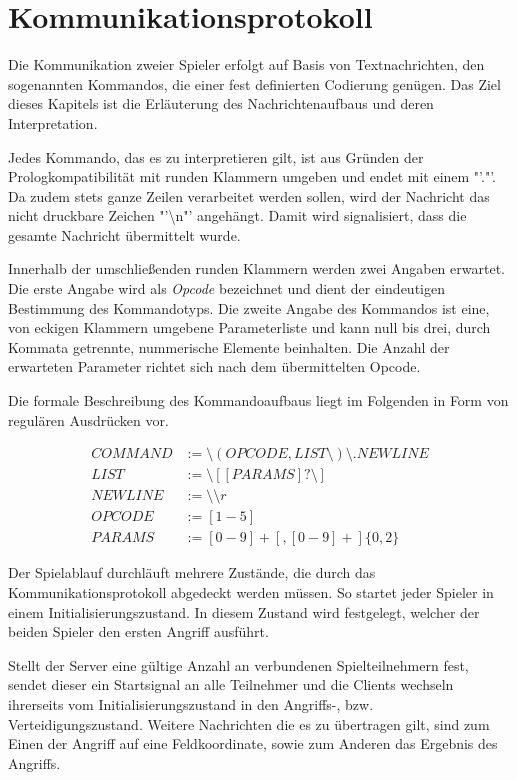 \section{Kommunikationsprotokoll}
\label{sec:Kommunikationsmodell}

Die Kommunikation zweier Spieler erfolgt auf Basis von Textnachrichten, den sogenannten Kommandos, die einer fest definierten Codierung genügen.
Das Ziel dieses Kapitels ist die Erläuterung des Nachrichtenaufbaus und deren Interpretation.

Jedes Kommando, das es zu interpretieren gilt, ist aus Gründen der Prologkompatibilität mit runden Klammern umgeben und endet mit einem "'."'.
Da zudem stets ganze Zeilen verarbeitet werden sollen, wird der Nachricht das nicht druckbare Zeichen "'\textbackslash n"' angehängt.
Damit wird signalisiert, dass die gesamte Nachricht übermittelt wurde.

Innerhalb der umschließenden runden Klammern werden zwei Angaben erwartet.
Die erste Angabe wird als \emph{Opcode} bezeichnet und dient der eindeutigen Bestimmung des Kommandotyps.
Die zweite Angabe des Kommandos ist eine, von eckigen Klammern umgebene Parameterliste und kann null bis drei, durch Kommata getrennte, nummerische Elemente beinhalten.
Die Anzahl der erwarteten Parameter richtet sich nach dem übermittelten Opcode.

Die formale Beschreibung des Kommandoaufbaus liegt im Folgenden in Form von regulären Ausdrücken vor.

\begin{align*}
	COMMAND &:= \text{\textbackslash}(OPCODE,LIST\text{\textbackslash}) \text{\textbackslash}. NEWLINE \\
	LIST &:= \text{\textbackslash}[ [PARAMS]? \text{\textbackslash}] \\
	NEWLINE &:= \text{\textbackslash \textbackslash} r \\
	OPCODE &:= [1-5] \\
	PARAMS &:= [0-9]+[,[0-9]+]\{0,2\}
\end{align*}

Der Spielablauf durchläuft mehrere Zustände, die durch das Kommunikationsprotokoll abgedeckt werden müssen.
So startet jeder Spieler in einem Initialisierungszustand.
In diesem Zustand wird festgelegt, welcher der beiden Spieler den ersten Angriff ausführt.

Stellt der Server eine gültige Anzahl an verbundenen Spielteilnehmern fest, sendet dieser ein Startsignal an alle Teilnehmer und die Clients wechseln ihrerseits vom Initialisierungszustand in den Angriffs-, bzw. Verteidigungszustand.
Weitere Nachrichten die es zu übertragen gilt, sind zum Einen der Angriff auf eine Feldkoordinate, sowie zum Anderen das Ergebnis des Angriffs.

